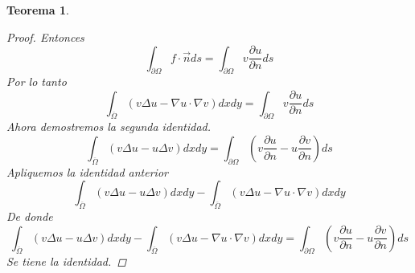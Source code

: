\documentclass[11pt]{book}
\theoremstyle{plain}
\newtheorem{teo}[proposición]{Teorema}
\theoremstyle{definition}
\begin{document}
\begin{teo}
\begin{proof}
            Entonces
            \[
                \int_{\partial \Omega} f \cdot \overrightarrow{n}ds = \int_{\partial \Omega} v \frac{\partial u}{\partial n}ds
            \]
            Por lo tanto
            \[
                \int_{\overline{\Omega}} \left(v \Delta u - \nabla u \cdot \nabla v\right)dxdy = \int_{\partial \Omega} v \frac{\partial u}{\partial n}ds
            \]
            Ahora demostremos la segunda identidad.
            \[
                \int_{\overline{\Omega}} \left(v \Delta u - u \Delta v\right)dxdy = \int_{\partial \Omega} \left(v \frac{\partial u}{\partial n} - u \frac{\partial v}{\partial n}\right)ds
            \]
            Apliquemos la identidad anterior
            \[
                \int_{\overline{\Omega}} \left(v \Delta u - u \Delta v\right)dxdy - \int_{\overline{\Omega}} \left(v \Delta u - \nabla u \cdot \nabla v\right)dxdy
            \]
            De donde
            \[
                \int_{\overline{\Omega}} \left(v \Delta u - u \Delta v\right)dxdy - \int_{\overline{\Omega}} \left(v \Delta u - \nabla u \cdot \nabla v\right)dxdy = \int_{\partial \Omega} \left(v \frac{\partial u}{\partial n} - u \frac{\partial v}{\partial n}\right)ds
            \]
            Se tiene la identidad.
        \end{proof}
    \end{teo}
\end{document}
